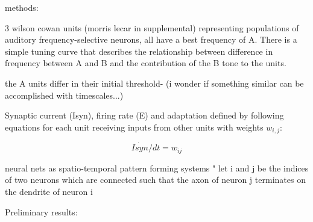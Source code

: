 methods:

3 wilson cowan units (morris lecar in supplemental) representing populations of auditory frequency-selective neurons, all have a best frequency of A. There is a simple tuning curve that describes the relationship between difference in frequency between A and B and the contribution of the B tone to the units.

the A units differ in their initial threshold- (i wonder if something similar can be accomplished with timescales...)




 Synaptic current (Isyn), firing rate (E) and adaptation defined by following equations for each unit receiving inputs from other units with weights $w_{i,j}$:


\begin{equation}
  \dot{Isyn} /dt = w_{ij}  
\end{equation}
% 

\cite{Ermentrout1997} neural nets as spatio-temporal pattern forming systems
" let i and j be the indices of two neurons which are connected such that the axon of neuron j terminates on the dendrite of neuron i




Preliminary results:

